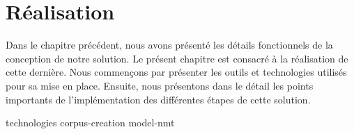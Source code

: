 \chapter{Réalisation}
\label{chap.realisation}

Dans le chapitre précédent, nous avons présenté les détails fonctionnels de la conception de notre solution.
Le présent chapitre est consacré à la réalisation de cette dernière.
Nous commençons par présenter les outils et technologies utilisés pour sa mise en place.
Ensuite, nous présentons dans le détail les points importants de l'implémentation des différentes étapes de cette solution.

{technologies}
{corpus-creation}
{model-nmt}